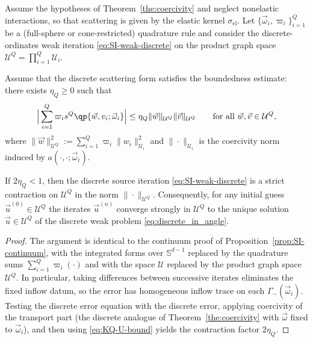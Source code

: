 \documentclass[final]{amsart}
\begin{document}
\begin{proposition}
\label{prop:SI-discrete}
Assume the hypotheses of Theorem~\ref{the:coercivity} and neglect
nonelastic interactions, so that scattering is given by the elastic
kernel $\sigma_{\mathrm{el}}$. Let $\{\vec\omega_i,\varpi_i\}_{i=1}^Q$ be a
(full-sphere or cone-restricted) quadrature rule and consider the
discrete-ordinates weak iteration \eqref{eq:SI-weak-discrete} on the
product graph space $\mathcal U^Q=\prod_{i=1}^Q\mathcal U_i$.

Assume that the discrete scattering form satisfies the boundedness
estimate: there exists $\eta_Q\ge 0$ such that
\begin{equation}
  \label{eq:KQ-U-bound}
  \Big|\sum_{i=1}^Q \varpi_i  s^Q\qp{\vec w,v_i;\vec\omega_i}\Big|
  \le
  \eta_Q \|\vec w\|_{\mathcal U^Q} \|\vec v\|_{\mathcal U^Q}
  \qquad\text{for all }\vec w,\vec v\in\mathcal U^Q,
\end{equation}
where $\|\vec w\|_{\mathcal U^Q}^2:=\sum_{i=1}^Q \varpi_i \|w_i\|_{\mathcal U_i}^2$
and $\|\cdot\|_{\mathcal U_i}$ is the coercivity norm induced by
$a(\cdot,\cdot;\vec\omega_i)$.

If $2\eta_Q<1$, then the discrete source iteration \eqref{eq:SI-weak-discrete}
is a strict contraction on $\mathcal U^Q$ in the norm $\|\cdot\|_{\mathcal U^Q}$.
Consequently, for any initial guess $\vec u^{(0)}\in\mathcal U^Q$ the iterates
$\vec u^{(n)}$ converge strongly in $\mathcal U^Q$ to the unique solution
$\vec u\in\mathcal U^Q$ of the discrete weak problem \eqref{eq:discrete_in_angle}.
\end{proposition}

\begin{proof}
The argument is identical to the continuum proof of
Proposition~\ref{prop:SI-continuum}, with the integrated forms over
$\mathbb S^{d-1}$ replaced by the quadrature sums
$\sum_{i=1}^Q\varpi_i(\cdot)$ and with the space $\mathcal U$ replaced by
the product graph space $\mathcal U^Q$. In particular, taking differences
between successive iterates eliminates the fixed inflow datum, so the
error has homogeneous inflow trace on each $\Gamma_-(\vec\omega_i)$.
Testing the discrete error equation with the discrete error, applying
coercivity of the transport part (the discrete analogue of
Theorem~\ref{the:coercivity} with $\vec\omega$ fixed to $\vec\omega_i$),
and then using \eqref{eq:KQ-U-bound} yields the contraction factor
$2\eta_Q$.
\end{proof}
\end{document}
